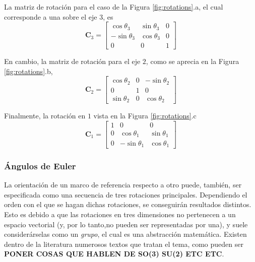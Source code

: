 La matriz de rotación para el caso de la Figura \ref{fig:rotations}.a, el cual corresponde a una sobre el eje $3$, es
\begin{equation}
    \bm{C}_3 = 
    \begin{bmatrix}
        \cos \theta_3 & \sin \theta_3 & 0 \\
        -\sin \theta_3 & \cos \theta_3 & 0 \\
        0 & 0 & 1
    \end{bmatrix}
\end{equation}

En cambio, la matriz de rotación para el eje $2$, como se aprecia en la Figura \ref{fig:rotations}.b,
\begin{equation}
    \bm{C}_2 = 
    \begin{bmatrix}
        \cos \theta_2 & 0 & - \sin \theta_2 \\
        0 & 1 & 0 \\
        \sin \theta_2 & 0 & \cos \theta_2
    \end{bmatrix}
\end{equation}

Finalmente, la rotación en $1$ vista en la Figura \ref{fig:rotations}.c
\begin{equation}
    \bm{C}_1 = 
    \begin{bmatrix}
        1 & 0 & 0 \\
        0 & \cos \theta_1 & \sin \theta_1 \\
        0 & -\sin \theta_1 & \cos \theta_1
    \end{bmatrix}
\end{equation}



\subsubsection{Ángulos de Euler}
La orientación de un marco de referencia respecto a otro puede, también, ser especificada como una secuencia de tres rotaciones principales. Dependiendo el orden con el que se hagan dichas rotaciones, se conseguirán resultados distintos. Esto es debido a que las rotaciones en tres dimensiones no pertenecen a un espacio vectorial (y, por lo tanto,no pueden ser representadas por una), y suele considerárselas como un \textit{grupo}, el cual es una abstracción matemática. Existen dentro de la literatura numerosos textos que tratan el tema, como pueden ser \textbf{PONER COSAS QUE HABLEN DE SO(3) SU(2) ETC ETC}.

